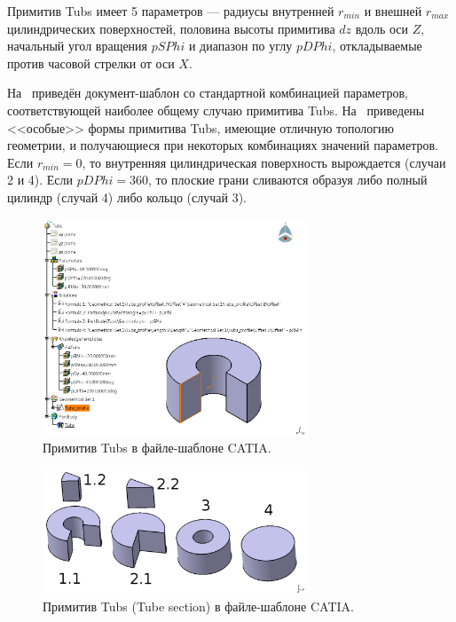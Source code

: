 Примитив Tubs имеет 5 параметров --- радиусы внутренней $r_{min}$ и внешней $r_{max}$ цилиндрических поверхностей, половина высоты примитива $dz$ вдоль оси $Z$, начальный угол вращения $pSPhi$ и диапазон по углу $pDPhi$, откладываемые против часовой стрелки от оси $X$.


На~ приведён документ-шаблон со стандартной комбинацией параметров, соответствующей наиболее общему случаю примитива Tubs. На~ приведены <<особые>> формы примитива Tubs, имеющие отличную топологию геометрии, и получающиеся при некоторых комбинациях значений параметров.
Если $r_{min}=0$, то внутренняя цилиндрическая поверхность вырождается (случаи 2 и 4).
Если $pDPhi = 360$, то плоские грани сливаются образуя либо полный цилиндр (случай 4) либо кольцо (случай 3).

\begin{figure}[H]
\centering
\includegraphics[width=0.7\textwidth]{pictures/Tubs_UDF_file.png}
\caption{Примитив Tubs в файле-шаблоне CATIA.}
\label{fig:TubsUDF}
\end{figure}

\begin{figure}[H]
\centering
\includegraphics[width=0.7\textwidth]{pictures/Tubs_cases_2.png}
\caption{Примитив Tubs (Tube section) в файле-шаблоне CATIA.}
\label{fig:TubsCases}
\end{figure}

